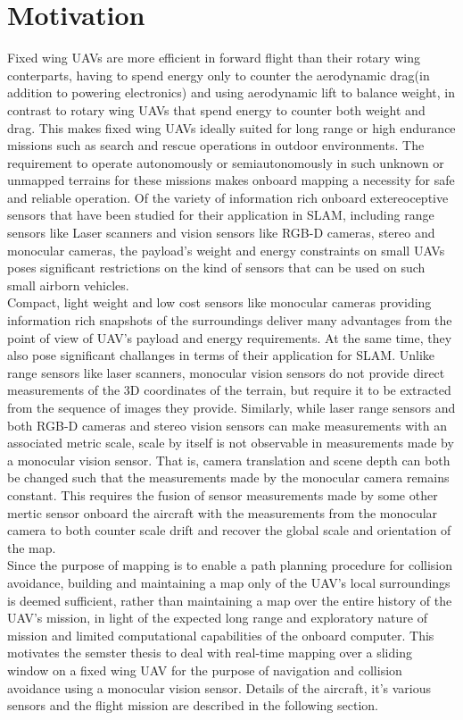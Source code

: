 \section{Motivation}
\label{sec:intro_motivation}
Fixed wing UAVs are more efficient in forward flight than their rotary wing conterparts, having to spend energy only to counter the aerodynamic drag(in addition to powering electronics) and using aerodynamic lift to balance weight, in contrast to rotary wing UAVs that spend energy to counter both weight and drag. This makes fixed wing UAVs ideally suited for long range or high endurance missions such as search and rescue operations in outdoor environments. The requirement to operate autonomously or semiautonomously in such unknown or unmapped terrains for these missions makes onboard mapping a necessity for safe and reliable operation. Of the variety of information rich onboard extereoceptive sensors that have been studied for their application in SLAM, including range sensors like Laser scanners and vision sensors like RGB-D cameras, stereo and monocular cameras, the payload's weight and energy constraints on small UAVs poses significant restrictions on the kind of sensors that can be used on such small airborn vehicles.\\ 
Compact, light weight and low cost sensors like monocular cameras providing information rich snapshots of the surroundings deliver many advantages from the point of view of UAV's payload and energy requirements. At the same time, they also pose significant challanges in terms of their application for SLAM. Unlike range sensors like laser scanners, monocular vision sensors do not provide direct measurements of the 3D coordinates of the terrain, but require it to be extracted from the sequence of images they provide. Similarly, while laser range sensors and both RGB-D cameras and stereo vision sensors can make measurements with an associated metric scale, scale by itself is not observable in measurements made by a monocular vision sensor. That is, camera translation and scene depth can both be changed such that the measurements made by the monocular camera remains constant. This requires the fusion of sensor measurements made by some other mertic sensor onboard the aircraft with the measurements from the monocular camera to both counter scale drift and recover the global scale and orientation of the map.\\
Since the purpose of mapping is to enable a path planning procedure for collision avoidance, building and maintaining a map only of the UAV's local surroundings is deemed sufficient, rather than maintaining a map over the entire history of the UAV's mission, in light of the expected long range and exploratory nature of mission and limited computational capabilities of the onboard computer. This motivates the semster thesis to deal with real-time mapping over a sliding window on a fixed wing UAV for the purpose of navigation and collision avoidance using a monocular vision sensor. Details of the aircraft, it's various sensors and the flight mission are described in the following section.

